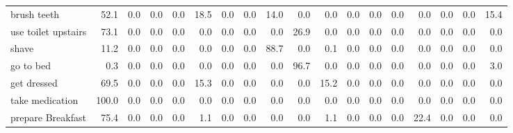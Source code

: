 \documentclass{article}
\begin{document}
\begin{sideways}
\begin{tabular}{lrrrrrrrrrrrrrrrrr}
brush teeth           &        52.1 &                0.0 &           0.0 &                          0.0 &               18.5 &                0.0 &                        0.0 &         14.0 &              0.0 &                0.0 &                    0.0 &                      0.0 &                  0.0 &                   0.0 &              0.0 &              0.0 &         15.4 \\
use toilet upstairs   &        73.1 &                0.0 &           0.0 &                          0.0 &                0.0 &                0.0 &                        0.0 &          0.0 &             26.9 &                0.0 &                    0.0 &                      0.0 &                  0.0 &                   0.0 &              0.0 &              0.0 &          0.0 \\
shave                 &        11.2 &                0.0 &           0.0 &                          0.0 &                0.0 &                0.0 &                        0.0 &         88.7 &              0.0 &                0.1 &                    0.0 &                      0.0 &                  0.0 &                   0.0 &              0.0 &              0.0 &          0.0 \\
go to bed             &         0.3 &                0.0 &           0.0 &                          0.0 &                0.0 &                0.0 &                        0.0 &          0.0 &             96.7 &                0.0 &                    0.0 &                      0.0 &                  0.0 &                   0.0 &              0.0 &              0.0 &          3.0 \\
get dressed           &        69.5 &                0.0 &           0.0 &                          0.0 &               15.3 &                0.0 &                        0.0 &          0.0 &              0.0 &               15.2 &                    0.0 &                      0.0 &                  0.0 &                   0.0 &              0.0 &              0.0 &          0.0 \\
take medication       &       100.0 &                0.0 &           0.0 &                          0.0 &                0.0 &                0.0 &                        0.0 &          0.0 &              0.0 &                0.0 &                    0.0 &                      0.0 &                  0.0 &                   0.0 &              0.0 &              0.0 &          0.0 \\
prepare Breakfast     &        75.4 &                0.0 &           0.0 &                          0.0 &                1.1 &                0.0 &                        0.0 &          0.0 &              0.0 &                1.1 &                    0.0 &                      0.0 &                  0.0 &                  22.4 &              0.0 &              0.0 &          0.0 \\

\end{tabular}
\end{sideways}
\end{document}
